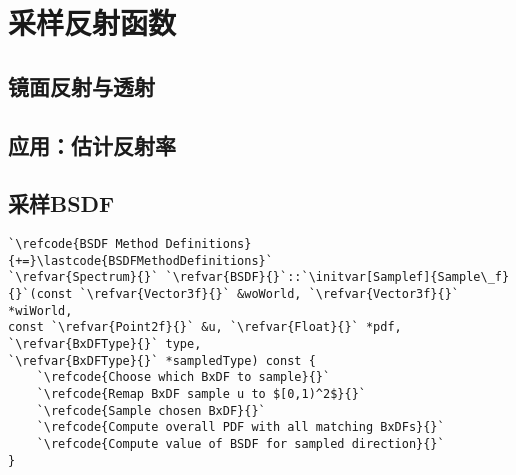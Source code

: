\section{采样反射函数}\label{sec:采样反射函数}

\subsection{镜面反射与透射}\label{sub:镜面反射与透射}
\subsection{应用：估计反射率}\label{sub:应用：估计反射率}
\subsection{采样BSDF}\label{sub:采样BSDF}
\begin{lstlisting}
`\refcode{BSDF Method Definitions}{+=}\lastcode{BSDFMethodDefinitions}`
`\refvar{Spectrum}{}` `\refvar{BSDF}{}`::`\initvar[Samplef]{Sample\_f}{}`(const `\refvar{Vector3f}{}` &woWorld, `\refvar{Vector3f}{}` *wiWorld,
const `\refvar{Point2f}{}` &u, `\refvar{Float}{}` *pdf, `\refvar{BxDFType}{}` type,
`\refvar{BxDFType}{}` *sampledType) const {
    `\refcode{Choose which BxDF to sample}{}`
    `\refcode{Remap BxDF sample u to $[0,1)^2$}{}`
    `\refcode{Sample chosen BxDF}{}`
    `\refcode{Compute overall PDF with all matching BxDFs}{}`
    `\refcode{Compute value of BSDF for sampled direction}{}`
}
\end{lstlisting}